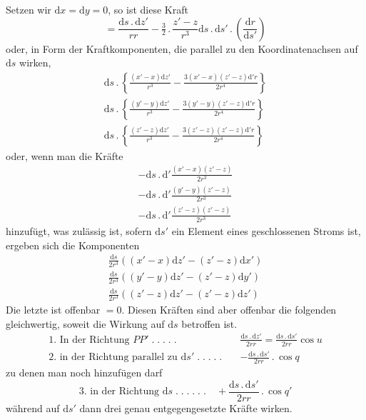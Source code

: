 Setzen wir $\mathrm dx=\mathrm dy=0$, so ist diese Kraft
\[
=\frac{\mathrm ds\,.\,\mathrm dz'}{rr}-\tfrac{3}{2}\,.\,\frac{z'-z}{r^3}\mathrm ds\,.\,\mathrm ds'\,.\,\left(\frac{\mathrm dr}{\mathrm ds'}\right)
\]
oder, in Form der Kraftkomponenten, die parallel zu den Koordinatenachsen auf $\mathrm ds$ wirken,
\[
\begin{gathered}
\mathrm ds\,.\,\left\{\frac{(x'-x)\mathrm dz'}{r^3}-\frac{3(x'-x)(z'-z)\mathrm d'r}{2r^4}\right\}\\[4pt]
\mathrm ds\,.\,\left\{\frac{(y'-y)\mathrm dz'}{r^3}-\frac{3(y'-y)(z'-z)\mathrm d'r}{2r^4}\right\}\\[4pt]
\mathrm ds\,.\,\left\{\frac{(z'-z)\mathrm dz'}{r^3}-\frac{3(z'-z)(z'-z)\mathrm d'r}{2r^4}\right\}
\end{gathered}
\]
oder, wenn man die Kräfte
\[
\begin{gathered}
-\mathrm ds\,.\,\mathrm d'\frac{(x'-x)(z'-z)}{2r^3}\\[4pt]
-\mathrm ds\,.\,\mathrm d'\frac{(y'-y)(z'-z)}{2r^3}\\[4pt]
-\mathrm ds\,.\,\mathrm d'\frac{(z'-z)(z'-z)}{2r^3}
\end{gathered}
\]
hinzufügt, was zulässig ist, sofern $\mathrm ds'$ ein Element eines geschlossenen Stroms ist, ergeben sich die Komponenten
\[
\begin{gathered}
\frac{\mathrm ds}{2r^3}((x'-x)\mathrm dz'-(z'-z)\mathrm dx')\\[4pt]
\frac{\mathrm ds}{2r^3}((y'-y)\mathrm dz'-(z'-z)\mathrm dy')\\[4pt]
\frac{\mathrm ds}{2r^3}((z'-z)\mathrm dz'-(z'-z)\mathrm dz')
\end{gathered}
\]
Die letzte ist offenbar $=0$. Diesen Kräften sind aber offenbar die folgenden gleichwertig, soweit die Wirkung auf $\mathrm ds$ betroffen ist.
\[
\begin{aligned}
\text{1. In der Richtung }PP'\; .\;.\;.\;.\;.\quad&\frac{\mathrm ds\,.\,\mathrm dz'}{2rr}=\frac{\mathrm ds\,.\,\mathrm ds'}{2rr}\cos u\\[4pt]
\text{2. in der Richtung parallel zu }\mathrm ds'\; .\;.\;.\;.\;.\quad&-\frac{\mathrm ds\,.\,\mathrm ds'}{2rr}\,.\,\cos q
\end{aligned}
\]
zu denen man noch hinzufügen darf
\[
\text{3. in der Richtung }\mathrm ds\; .\;.\;.\;.\;.\;.\quad+\frac{\mathrm ds\,.\,\mathrm ds'}{2rr}\,.\,\cos q'
\]
während auf $\mathrm ds'$ dann drei genau entgegengesetzte Kräfte wirken.

